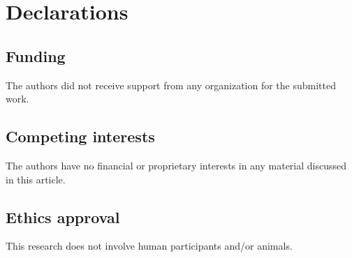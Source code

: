 \documentclass[default,iicol]{sn-jnl}
\theoremstyle{thmstyleone}\newtheorem{theorem}{Theorem}\newtheorem{proposition}[theorem]{Proposition}
\theoremstyle{thmstyletwo}\newtheorem{example}{Example}\newtheorem{remark}{Remark}
\theoremstyle{thmstylethree}\newtheorem{definition}{Definition}
\begin{document}
\section{Declarations}
\subsection{Funding}
The authors did not receive support from any organization for the submitted work.

\subsection{Competing interests}
The authors have no financial or proprietary interests in any material discussed in this article.

\subsection{Ethics approval}
This research does not involve human participants and/or animals.



\end{document}
